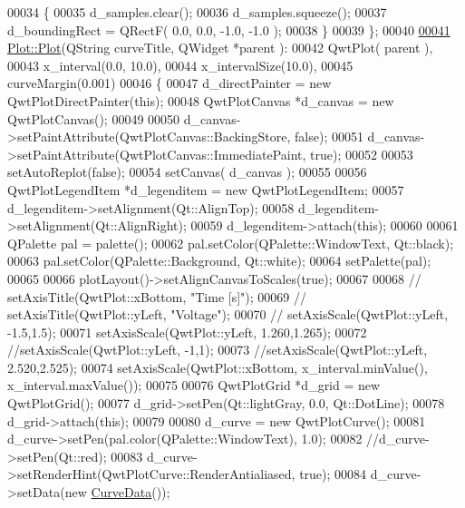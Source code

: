 \begin{DoxyCode}
00034     \{
00035         d\_samples.clear();
00036         d\_samples.squeeze();
00037         d\_boundingRect = QRectF( 0.0, 0.0, -1.0, -1.0 );
00038     \}
00039 \};
00040 
\hypertarget{plot_8cpp_source.tex_l00041}{}\hyperlink{classPlot_a26093e28c6d18a6324f421278474538d}{00041} \hyperlink{classPlot_a26093e28c6d18a6324f421278474538d}{Plot::Plot}(QString curveTitle, QWidget *parent ):
00042     QwtPlot( parent ),
00043     x\_interval(0.0, 10.0),
00044     x\_intervalSize(10.0),
00045     curveMargin(0.001)
00046 \{
00047     d\_directPainter = \textcolor{keyword}{new} QwtPlotDirectPainter(\textcolor{keyword}{this});
00048     QwtPlotCanvas *d\_canvas = \textcolor{keyword}{new} QwtPlotCanvas();
00049 
00050     d\_canvas->setPaintAttribute(QwtPlotCanvas::BackingStore, \textcolor{keyword}{false});
00051     d\_canvas->setPaintAttribute(QwtPlotCanvas::ImmediatePaint, \textcolor{keyword}{true});
00052 
00053     setAutoReplot(\textcolor{keyword}{false});
00054     setCanvas( d\_canvas );
00055 
00056     QwtPlotLegendItem *d\_legenditem = \textcolor{keyword}{new} QwtPlotLegendItem;
00057     d\_legenditem->setAlignment(Qt::AlignTop);
00058     d\_legenditem->setAlignment(Qt::AlignRight);
00059     d\_legenditem->attach(\textcolor{keyword}{this});
00060 
00061     QPalette pal = palette();
00062     pal.setColor(QPalette::WindowText, Qt::black);
00063     pal.setColor(QPalette::Background, Qt::white);
00064     setPalette(pal);
00065 
00066     plotLayout()->setAlignCanvasToScales(\textcolor{keyword}{true});
00067 
00068 \textcolor{comment}{//    setAxisTitle(QwtPlot::xBottom, "Time [s]");}
00069 \textcolor{comment}{//    setAxisTitle(QwtPlot::yLeft, "Voltage");}
00070 \textcolor{comment}{//    setAxisScale(QwtPlot::yLeft, -1.5,1.5);}
00071     setAxisScale(QwtPlot::yLeft, 1.260,1.265);
00072     \textcolor{comment}{//setAxisScale(QwtPlot::yLeft, -1,1);}
00073     \textcolor{comment}{//setAxisScale(QwtPlot::yLeft, 2.520,2.525);}
00074     setAxisScale(QwtPlot::xBottom, x\_interval.minValue(), x\_interval.maxValue());
00075 
00076     QwtPlotGrid *d\_grid = \textcolor{keyword}{new} QwtPlotGrid();
00077     d\_grid->setPen(Qt::lightGray, 0.0, Qt::DotLine);
00078     d\_grid->attach(\textcolor{keyword}{this});
00079 
00080     d\_curve = \textcolor{keyword}{new} QwtPlotCurve();
00081     d\_curve->setPen(pal.color(QPalette::WindowText), 1.0);
00082     \textcolor{comment}{//d\_curve->setPen(Qt::red);}
00083     d\_curve->setRenderHint(QwtPlotCurve::RenderAntialiased, \textcolor{keyword}{true});
00084     d\_curve->setData(\textcolor{keyword}{new} \hyperlink{classCurveData}{CurveData}());

\end{DoxyCode}
